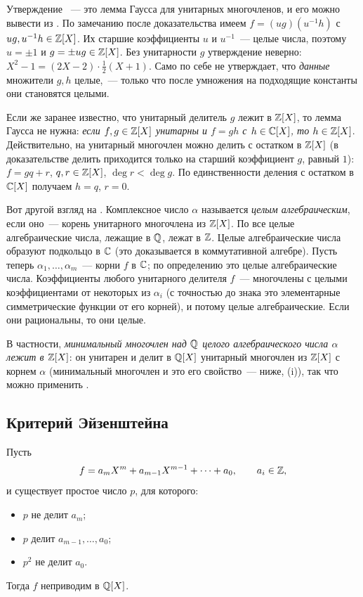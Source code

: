 \begin{remark}[1.14a]
Утверждение ~--- это лемма Гаусса для унитарных многочленов, и его можно вывести из . По замечанию после
доказательства  имеем $f=(ug)(u^{-1}h)$ с $ug,u^{-1}h\in\mathbb Z[X]$. Их старшие коэффициенты $u$ и $u^{-1}$~--- целые
числа, поэтому $u=\pm1$ и $g=\pm ug\in\mathbb Z[X]$. Без унитарности $g$ утверждение неверно:
$X^2-1=(2X-2)\cdot\tfrac12(X+1)$. Само по себе  не утверждает, что \emph{данные} множители $g,h$ целые,~--- только
что после умножения на подходящие константы они становятся целыми.

Если же заранее известно, что унитарный делитель $g$ лежит в $\mathbb Z[X]$, то лемма Гаусса не нужна: \emph{если $f,g\in\mathbb Z[X]$
унитарны и $f=gh$ с $h\in\mathbb C[X]$, то $h\in\mathbb Z[X]$}. Действительно, на унитарный многочлен можно делить с остатком в $\mathbb Z[X]$
(в доказательстве  делить приходится только на старший коэффициент $g$, равный $1$): $f=gq+r$, $q,r\in\mathbb Z[X]$,
$\deg r<\deg g$. По единственности деления с остатком в $\mathbb C[X]$ получаем $h=q$, $r=0$.
\end{remark}

\begin{aside}[1.15]
Вот другой взгляд на . Комплексное число $\alpha$ называется \emph{целым алгебраическим}, если оно~--- корень
унитарного многочлена из $\mathbb Z[X]$. По  все целые алгебраические числа, лежащие в $\mathbb Q$, лежат в $\mathbb Z$. Целые
алгебраические числа образуют подкольцо в $\mathbb C$ (это доказывается в коммутативной алгебре). Пусть теперь
$\alpha_1,\dots,\alpha_m$~--- корни $f$ в $\mathbb C$; по определению это целые алгебраические числа. Коэффициенты любого
унитарного делителя $f$~--- многочлены с целыми коэффициентами от некоторых из $\alpha_i$ (с точностью до знака это
элементарные симметрические функции от его корней), и потому целые алгебраические. Если они рациональны, то они целые.

В частности, \emph{минимальный многочлен над $\mathbb Q$ целого алгебраического числа $\alpha$ лежит в $\mathbb Z[X]$}: он унитарен и
делит в $\mathbb Q[X]$ унитарный многочлен из $\mathbb Z[X]$ с корнем $\alpha$ (минимальный многочлен и это его свойство~--- ниже,
(i)), так что можно применить .
\end{aside}

\subsection*{Критерий Эйзенштейна}

\begin{proposition}
Пусть
\[
f=a_mX^m+a_{m-1}X^{m-1}+\dots+a_0,\qquad a_i\in\mathbb Z,
\]
и существует простое число $p$, для которого:
\begin{itemize}
\item $p$ не делит $a_m$;
\item $p$ делит $a_{m-1},\dots,a_0$;
\item $p^2$ не делит $a_0$.
\end{itemize}
Тогда $f$ неприводим в $\mathbb Q[X]$.
\end{proposition}

